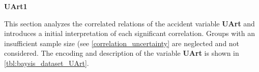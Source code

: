 \Large
\centerline{\textbf{UArt1}}
\normalsize
This section analyzes the correlated relations of the accident variable \textbf{UArt} and introduces a initial interpretation of each significant correlation. Groups with an insufficient sample size (see \cref{correlation_uncertainty} are neglected and not considered. The encoding and description of the variable \textbf{UArt} is shown in \cref{tbl:baysis_dataset_UArt}. 


